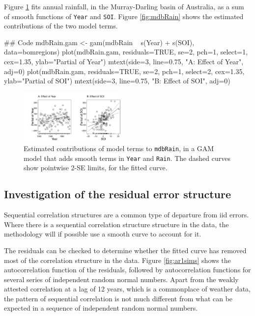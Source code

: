 \documentclass{tufte-book}\usepackage[]{graphicx}\usepackage[]{color}
\newcommand{\txtt}[1]{\texttt{#1}}
\begin{document}
Figure \ref{fig:mdbRainSM} fits annual rainfall, in the Murray-Darling basin of
Australia, as a sum of smooth functions of \txtt{Year} and \txtt{SOI}.
Figure \ref{fig:mdbRain} shows the estimated contributions of the two
model terms.
\begin{Schunk}
\begin{Sinput}
## Code
mdbRain.gam <- gam(mdbRain ~ s(Year) + s(SOI),
                   data=bomregions)
plot(mdbRain.gam, residuals=TRUE, se=2, pch=1,
     select=1, cex=1.35, ylab="Partial of Year")
mtext(side=3, line=0.75, "A: Effect of Year", adj=0)
plot(mdbRain.gam, residuals=TRUE, se=2, pch=1,
     select=2, cex=1.35, ylab="Partial of SOI")
mtext(side=3, line=0.75, "B: Effect of SOI", adj=0)
\end{Sinput}
\end{Schunk}
\begin{figure}
\begin{Schunk}


\centerline{\includegraphics[width=0.47\textwidth]{figs/12-mdb-gam-1} }

\end{Schunk}
  \caption{Estimated contributions of model terms to
    \txtt{mdbRain}, in a GAM model that adds smooth terms in
    \txtt{Year} and \txtt{Rain}. The dashed curves show pointwise
    2-SE limits, for the fitted curve.}\label{fig:mdbRainSM}
\end{figure}

\subsection*{Investigation of the residual error structure}
Sequential correlation structures are a common type of departure from
iid errors.  Where there is a sequential correlation structure
structure in the data, the methodology will if possible use a smooth
curve to account for it.

The residuals can be checked to determine whether the fitted curve
has removed most of the correlation structure in the data.
Figure \ref{fig:ar1sims} shows the autocorrelation function of the
residuals, followed by autocorrelation functions for several series of
independent random normal numbers.  Apart from the weakly attested
correlation at a lag of 12 years, which is a commonplace of weather
data, the pattern of sequential correlation is not much different from
what can be expected in a sequence of independent random normal
numbers.
\end{document}
